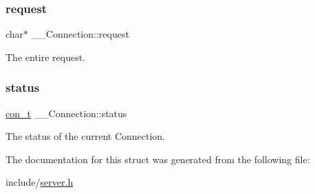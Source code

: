 \mbox{\label{struct_____connection_aee994fd59229c469bc2489350a981590}} 
\subsubsection{\texorpdfstring{request}{request}}
{\footnotesize\ttfamily char$\ast$ \+\_\+\+\_\+\+Connection\+::request}



The entire request. 

\mbox{\label{struct_____connection_ab68ce7496aed662e1431a1c29d7c2a10}} 
\subsubsection{\texorpdfstring{status}{status}}
{\footnotesize\ttfamily \mbox{\hyperlink{server_8h_adff1af7110b02fbef1d43e5a4b638ee8}{con\+\_\+t}} \+\_\+\+\_\+\+Connection\+::status}



The status of the current Connection. 



The documentation for this struct was generated from the following file\+:\begin{DoxyCompactItemize}
\item 
include/\mbox{\hyperlink{server_8h}{server.\+h}}\end{DoxyCompactItemize}
